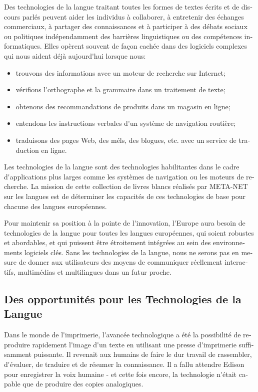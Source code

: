 \documentclass[]{../metanetpaper}
\begin{document}
\begin{french}
\begin{multicols}{2}
Des technologies de la langue traitant toutes les formes de textes
écrits et de discours parlés peuvent aider les individus à collaborer,
à entretenir des échanges commerciaux, à partager des connaissances et
à participer à des débats sociaux ou politiques indépendamment des
barrières linguistiques ou des compétences informatiques. Elles
opèrent souvent de façon cachée dans des logiciels complexes qui nous
aident déjà aujourd{\mbox '}hui lorsque nous:
\begin{itemize}
\item trouvons des informations avec un moteur de recherche sur
  Internet;
\item vérifions l{\mbox '}orthographe et la grammaire dans un
  traitement de texte;
\item obtenons des recommandations de produits dans un magasin en
  ligne;
\item entendons les instructions verbales d{\mbox '}un système de
  navigation routière;
\item traduisons des pages Web, des méls, des blogues, etc. avec un service de traduction en ligne.
\end{itemize}
Les technologies de la langue sont des technologies habilitantes dans
le cadre d{\mbox '}applications plus larges comme les systèmes de
navigation ou les moteurs de recherche. La mission de cette collection
de livres blancs réalisés par META-NET sur les langues est de
déterminer les capacités de ces technologies de base pour chacune des
langues européennes.


Pour maintenir sa position à la pointe de l{\mbox '}innovation,
l{\mbox '}Europe aura besoin de technologies de la langue pour toutes
les langues européennes, qui soient robustes et abordables, et qui
puissent être étroitement intégrées au sein des environnements
logiciels clés. Sans les technologies de la langue, nous ne serons pas
en mesure de donner aux utilisateurs des moyens de communiquer
réellement interactifs, multimédias et multilingues dans un futur
proche.

\subsection{Des opportunités pour les Technologies de la Langue}

Dans le monde de l{\mbox '}imprimerie, l{\mbox '}avancée technologique
a été la possibilité de reproduire rapidement l{\mbox '}image d{\mbox
 '}un texte en utilisant une presse d{\mbox '}imprimerie suffisamment
puissante. Il revenait aux humains de faire le dur travail de
rassembler, d{\mbox '}évaluer, de traduire et de résumer la
connaissance. Il a fallu attendre Edison pour enregistrer la voix
humaine - et cette fois encore, la technologie n{\mbox '}était capable
que de produire des copies analogiques.


\end{multicols}
\end{french}
\end{document}
